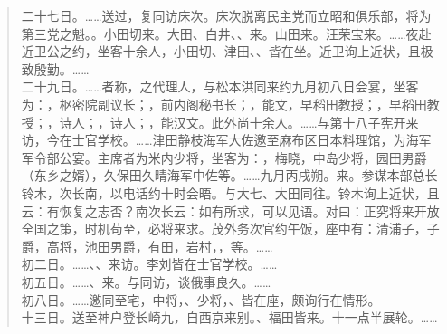 \begin{quote}
二十七日。……送过，复同访床次。床次脱离民主党而立昭和俱乐部，将为第三党之魁。。小田切来。大田、白井、、来。山田来。汪荣宝来。……夜赴近卫公之约，坐客十余人，小田切、津田、、皆在坐。近卫询上近状，且极致殷勤。……\\

二十九日。……者称，之代理人，与松本洪同来约九月初八日会宴，坐客为：，枢密院副议长；，前内阁秘书长；，能文，早稻田教授；，早稻田教授；，诗人；，诗人；，能汉文。此外尚十余人。……与第十八子宪开来访，今在士官学校。……津田静枝海军大佐邀至麻布区日本料理馆，为海军军令部公宴。主席者为米内少将，坐客为：，梅晓，中岛少将，园田男爵（东乡之婿），久保田久晴海军中佐等。……九月丙戌朔。来。参谋本部总长铃木，次长南，以电话约十时会晤。与大七、大田同往。铃木询上近状，且云：有恢复之志否？南次长云：如有所求，可以见语。对曰：正究将来开放全国之策，时机苟至，必将来求。茂外务次官约午饭，座中有：清浦子，子爵，高将，池田男爵，有田，岩村，，等。……\\

初二日。……、、来访。李刘皆在士官学校。……\\

初五日。……、来。与同访，谈俄事良久。……\\

初八日。……邀同至宅，中将，、少将，、皆在座，颇询行在情形。\\

十三日。送至神户登长崎九，自西京来别。、福田皆来。十一点半展轮。……\\
\end{quote}

